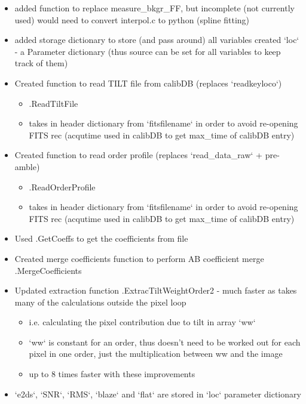\begin{itemize}
\item added function to replace measure\_bkgr\_FF, but incomplete (not currently used) would need to convert interpol.c to python (spline fitting)

\item added storage dictionary to store (and pass around) all variables created `loc` - a Parameter dictionary (thus source can be set for all variables to keep track of them)

\item Created function to read TILT file from calibDB (replaces `readkeyloco`)
	\begin{itemize}
    \item \spirouImage.ReadTiltFile
    \item takes in header dictionary from `fitsfilename` in order to avoid re-opening FITS rec (acqutime used in calibDB to get max\_time of calibDB entry) 
    \end{itemize}
\item Created function to read order profile (replaces `read\_data\_raw` + pre-amble)
	\begin{itemize}
	\item \spirouImage.ReadOrderProfile
	\item takes in header dictionary from `fitsfilename` in order to avoid re-opening FITS rec (acqutime used in calibDB to get max\_time of calibDB entry) 
    \end{itemize}
\item Used \spirouLOCOR.GetCoeffs to get the coefficients from file

\item Created merge coefficients function to perform AB coefficient merge \spirouLOCOR.MergeCoefficients
    
\item Updated extraction function \spirouEXTOR.ExtracTiltWeightOrder2 - much faster as takes many of the calculations outside the pixel loop
	\begin{itemize}
	\item i.e. calculating the pixel contribution due to tilt in array `ww`
	\item `ww` is constant for an order, thus doesn't need to be worked out for each pixel in one order, just the multiplication between ww and the image
	\item up to 8 times faster with these improvements
    \end{itemize}
\item `e2ds`, `SNR`, `RMS`, `blaze` and `flat` are stored in `loc` parameter dictionary


\end{itemize}

